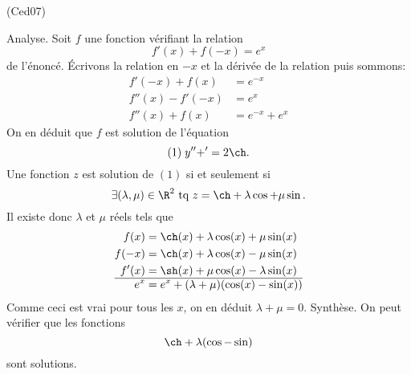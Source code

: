 \begin{tiny}(Ced07)\end{tiny} Analyse. Soit $f$ une fonction vérifiant la relation 
\[
  f'(x) + f(-x) = e^x
\]
de l'énoncé. \'Ecrivons la relation en $-x$ et la dérivée de la relation puis sommons:
\[
  \begin{aligned}
    f'(-x) + f(x) &= e^{-x} \\
    f''(x) - f'(-x) &= e^x \\ \hline
    f''(x) + f(x) &= e^{-x} + e^x
  \end{aligned}
\]
On en déduit que $f$ est solution de l'équation
\[
  (1)\; y'' + ' = 2\ch.
\]
Une fonction $z$ est solution de $(1)$ si et seulement si
\[
  \exists(\lambda, \mu)\in \R^2 \text{ tq }
  z = \ch + \lambda \cos + \mu \sin.
\]
Il existe donc $\lambda$ et $\mu$ réels tels que
\[
\begin{aligned}
f(x) &= \ch(x) + \lambda \cos(x) + \mu\sin(x) \\
f(-x) &= \ch(x) + \lambda \cos(x) - \mu\sin(x) \\
f'(x) &= \sh(x) + \mu\cos(x) - \lambda \sin(x)  \\ \hline 
e^x &= e^x + (\lambda + \mu)(\cos(x) - \sin(x))
\end{aligned}
\]
Comme ceci est vrai pour tous les $x$, on en déduit $\lambda + \mu = 0$.\newline
Synthèse.\newline
On peut vérifier que les fonctions
\[
  \ch + \lambda(\cos - \sin)
\]
sont solutions.
